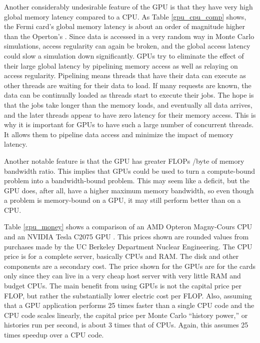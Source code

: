 Another considerably undesirable feature of the GPU is that they have very high global memory latency compared to a CPU.  As Table \ref{gpu_cpu_comp} shows, the Fermi card's global memory latency is about an order of magnitude higher than the Operton's \cite{cpu_latency,cuda}.  Since data is accessed in a very random way in Monte Carlo simulations, access regularity can again be broken, and the global access latency could slow a simulation down significantly.  GPUs try to eliminate the effect of their large global latency by pipelining memory access as well as relaying on access regularity.  Pipelining means threads that have their data can execute as other threads are waiting for their data to load.  If many requests are known, the data can be continually loaded as threads start to execute their jobs.  The hope is that the jobs take longer than the memory loads, and eventually all data arrives, and the later threads appear to have zero latency for their memory access.  This is why it is important for GPUs to have such a large number of concurrent threads.  It allows them to pipeline data access and minimize the impact of memory latency.

Another notable feature is that the GPU has greater FLOPs /byte of memory bandwidth ratio.  This implies that GPUs could be used to turn a compute-bound problem into a bandwidth-bound problem.  This may seem like a deficit, but the GPU does, after all, have a higher maximum memory bandwidth, so even though a problem is memory-bound on a GPU, it may still perform better than on a CPU.

Table \ref{gpu_money} shows a comparison of an AMD Opteron Magny-Cours CPU and an NVIDIA Tesla C2075 GPU \cite{cpu_latency,cuda}.  This prices shown are rounded values from purchases made by the UC Berkeley Department Nuclear Engineering.  The CPU price is for a complete server, basically CPUs and RAM.  The disk and  other components are a secondary cost.  The price shown for the GPUs are for the cards only since they can live in a very cheap host server with very little RAM and budget CPUs.  The main benefit from using GPUs is not the capital price per FLOP, but rather the substantially lower electric cost per FLOP.  Also, assuming that a GPU application performs 25 times faster than a single CPU code and the CPU code scales linearly, the capital price per Monte Carlo ``history power,'' or histories run per second, is about 3 times that of CPUs.  Again, this assumes 25 times speedup over a CPU code.  

